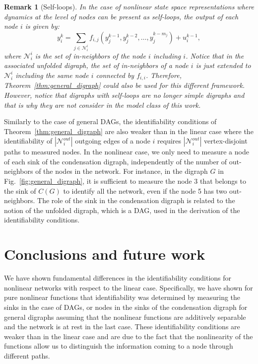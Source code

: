\documentclass[letterpaper,10pt,journal]{IEEEtran}
\newtheorem{remark}{Remark}
\newcommand{\abs}[1]{\left|#1\right|}
\newcommand{\NN}{\mathcal{N}}
\begin{document}
\begin{remark}[Self-loops]
    In the case of nonlinear state space representations where dynamics at the level of nodes can be present as self-loops, the output of each node $i$ is given by:
\begin{equation}\label{eq:nonlinear_model_including_i}
y_i^k=\sum_{j\in \mathcal{N}_i^i}f_{i,j}(y_j^{k-1},y_j^{k-2},\ldots,y_j^{k-m_j})+u_i^{k-1}, 
\end{equation}
where $\NN_i^i$ is the set of in-neighbors of the node $i$ including $i$. Notice that in the associated unfolded digraph, the set of in-neighbors of a node $i$ is just extended to $\NN_i^i$ including the same node $i$ connected by $f_{i,i}$. Therefore, Theorem~\ref{thm:general_digraph} could also be used for this different framework. However, notice that digraphs with self-loops are no longer simple digraphs and that is why they are not consider in the model class of this work.  
\end{remark}

Similarly to the case of general DAGs, the identifiability conditions of Theorem~\ref{thm:general_digraph} are also weaker than in the linear case where the identifiability of $\abs{\NN_i^{out}}$ outgoing edges of a node $i$ requires $\abs{\NN_i^{out}}$ vertex-disjoint paths to measured nodes. In the nonlinear case, we only need to measure a node of each sink of the condensation digraph, independently of the number of out-neighbors of the nodes in the network. For instance, in the digraph $G$ in Fig.~\ref{fig:general_digraph}, it is sufficient to measure the node 3 that belongs to the sink of $C(G)$ to identify all the network, even if the node 5 has two out-neighbors. The role of the sink in the condensation digraph is related to the notion of the unfolded digraph, which is a DAG, used in the derivation of the identifiability conditions.






\section{Conclusions and future work}\label{sec:conclusions}

We have shown fundamental differences in the identifiability conditions for nonlinear networks with respect to the linear case. Specifically, we have shown for pure nonlinear functions that identifiability was determined by measuring the sinks in the case of DAGs, or nodes in the sinks of the condensation digraph for general digraphs assuming that the nonlinear functions are additively separable and the network is at rest in the last case. These identifiability conditions are weaker than in the linear case and are due to the fact that the nonlinearity of the functions allow us to distinguish the information coming to a node through different paths.
\end{document}
